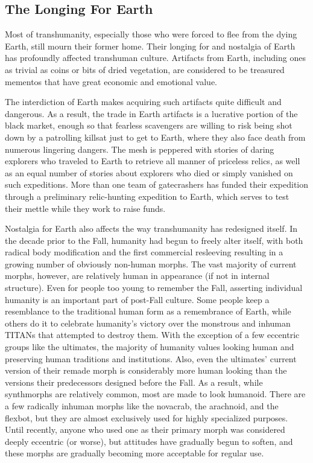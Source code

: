 \subsection{The Longing For Earth}

Most of transhumanity, especially those who were 
forced to flee from the dying Earth, still mourn their 
former home. Their longing for and nostalgia of 
Earth has profoundly affected transhuman culture. 
Artifacts from Earth, including ones as trivial as 
coins or bits of dried vegetation, are considered to 
be treasured mementos that have great economic and 
emotional value.

The interdiction of Earth makes acquiring such 
artifacts quite difficult and dangerous. As a result, the 
trade in Earth artifacts is a lucrative portion of the 
black market, enough so that fearless scavengers are 
willing to risk being shot down by a patrolling killsat 
just to get to Earth, where they also face death from 
numerous lingering dangers. The mesh is peppered 
with stories of daring explorers who traveled to Earth 
to retrieve all manner of priceless relics, as well as 
an equal number of stories about explorers who died 
or simply vanished on such expeditions. More than 
one team of gatecrashers has funded their expedition through a preliminary relic-hunting expedition 
to Earth, which serves to test their mettle while they 
work to raise funds.

Nostalgia for Earth also affects the way transhumanity has redesigned itself. In the decade prior to 
the Fall, humanity had begun to freely alter itself, 
with both radical body modification and the first 
commercial resleeving resulting in a growing number 
of obviously non-human morphs. The vast majority 
of current morphs, however, are relatively human 
in appearance (if not in internal structure). Even for 
people too young to remember the Fall, asserting 
individual humanity is an important part of post-Fall culture. Some people keep a resemblance to the 
traditional human form as a remembrance of Earth, 
while others do it to celebrate humanity's victory over 
the monstrous and inhuman TITANs that attempted 
to destroy them. With the exception of a few eccentric 
groups like the ultimates, the majority of humanity 
values looking human and preserving human traditions and institutions. Also, even the ultimates' current version of their remade morph is considerably 
more human looking than the versions their predecessors designed before the Fall. As a result, while synthmorphs are relatively common, most are made to look 
humanoid. There are a few radically inhuman morphs 
like the novacrab, the arachnoid, and the flexbot, but 
they are almost exclusively used for highly specialized 
purposes. Until recently, anyone who used one as their 
primary morph was considered deeply eccentric (or 
worse), but attitudes have gradually begun to soften, 
and these morphs are gradually becoming more acceptable for regular use.

